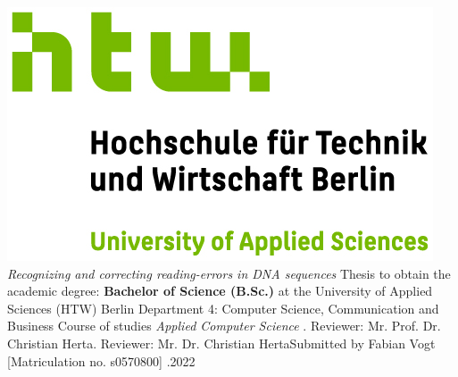 \documentclass[oneside,bibliography=totocnumbered,BCOR=5mm]{scrbook}%
\theoremstyle{definition}
\theoremstyle{definition}
\theoremstyle{definition}
\theoremstyle{definition}
\theoremstyle{definition}
\theoremstyle{definition}
\begin{document}
\begin{titlepage}
\begin{center}
\includegraphics{HTW_Berlin_Logo_farbig.jpg}
\linebreak[4]
\linebreak[4]
\linebreak[4]
\linebreak[4]
\textit{\Large Recognizing and correcting reading-errors in DNA sequences }
\linebreak[4]
\linebreak[4]
\linebreak[4]
Thesis 
\linebreak[4]
\linebreak[4]
to obtain the academic degree: 
\linebreak[4]
\linebreak[4]
\textbf{Bachelor of Science (B.Sc.)}
\linebreak[4]
\linebreak[4]
at the
\linebreak[4]
\linebreak[4]
University of Applied Sciences (HTW) Berlin
\linebreak[4]
Department 4: Computer Science, Communication and Business
\linebreak[4]
Course of studies \textit{Applied Computer Science}
\linebreak[4]
\linebreak[4]
. Reviewer: Mr. Prof. Dr. Christian Herta. Reviewer: Mr. Dr. Christian Herta\linebreak[4]
\linebreak[4]
\linebreak[4]
\linebreak[4]
\linebreak[4]
Submitted by Fabian Vogt [Matriculation no. s0570800]
\linebreak[4]
\linebreak[4]
\linebreak[4]
.2022

\end{center}
\end{titlepage}
\newpage    %
\end{document}
